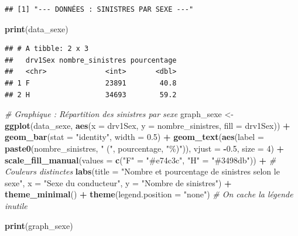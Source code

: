 \documentclass[
]{article}
\newenvironment{Shaded}{\begin{snugshade}}{\end{snugshade}}
\newcommand{\AttributeTok}[1]{\textcolor[rgb]{0.13,0.29,0.53}{#1}}
\newcommand{\CommentTok}[1]{\textcolor[rgb]{0.56,0.35,0.01}{\textit{#1}}}
\newcommand{\DecValTok}[1]{\textcolor[rgb]{0.00,0.00,0.81}{#1}}
\newcommand{\FloatTok}[1]{\textcolor[rgb]{0.00,0.00,0.81}{#1}}
\newcommand{\FunctionTok}[1]{\textcolor[rgb]{0.13,0.29,0.53}{\textbf{#1}}}
\newcommand{\NormalTok}[1]{#1}
\newcommand{\OtherTok}[1]{\textcolor[rgb]{0.56,0.35,0.01}{#1}}
\newcommand{\SpecialCharTok}[1]{\textcolor[rgb]{0.81,0.36,0.00}{\textbf{#1}}}
\newcommand{\StringTok}[1]{\textcolor[rgb]{0.31,0.60,0.02}{#1}}
\begin{document}
\begin{verbatim}
## [1] "--- DONNÉES : SINISTRES PAR SEXE ---"
\end{verbatim}

\begin{Shaded}
\begin{Highlighting}[]
\FunctionTok{print}\NormalTok{(data\_sexe)}
\end{Highlighting}
\end{Shaded}

\begin{verbatim}
## # A tibble: 2 x 3
##   drv1Sex nombre_sinistres pourcentage
##   <chr>              <int>       <dbl>
## 1 F                  23891        40.8
## 2 H                  34693        59.2
\end{verbatim}

\begin{Shaded}
\begin{Highlighting}[]
\CommentTok{\# Graphique : Répartition des sinistres par sexe}
\NormalTok{graph\_sexe }\OtherTok{\textless{}{-}} \FunctionTok{ggplot}\NormalTok{(data\_sexe, }\FunctionTok{aes}\NormalTok{(}\AttributeTok{x =}\NormalTok{ drv1Sex, }\AttributeTok{y =}\NormalTok{ nombre\_sinistres, }\AttributeTok{fill =}\NormalTok{ drv1Sex)) }\SpecialCharTok{+}
  \FunctionTok{geom\_bar}\NormalTok{(}\AttributeTok{stat =} \StringTok{"identity"}\NormalTok{, }\AttributeTok{width =} \FloatTok{0.5}\NormalTok{) }\SpecialCharTok{+}
  \FunctionTok{geom\_text}\NormalTok{(}\FunctionTok{aes}\NormalTok{(}\AttributeTok{label =} \FunctionTok{paste0}\NormalTok{(nombre\_sinistres, }\StringTok{" ("}\NormalTok{, pourcentage, }\StringTok{"\%)"}\NormalTok{)), }\AttributeTok{vjust =} \SpecialCharTok{{-}}\FloatTok{0.5}\NormalTok{, }\AttributeTok{size =} \DecValTok{4}\NormalTok{) }\SpecialCharTok{+}
  \FunctionTok{scale\_fill\_manual}\NormalTok{(}\AttributeTok{values =} \FunctionTok{c}\NormalTok{(}\StringTok{"F"} \OtherTok{=} \StringTok{"\#e74c3c"}\NormalTok{, }\StringTok{"H"} \OtherTok{=} \StringTok{"\#3498db"}\NormalTok{)) }\SpecialCharTok{+} \CommentTok{\# Couleurs distinctes}
  \FunctionTok{labs}\NormalTok{(}\AttributeTok{title =} \StringTok{"Nombre et pourcentage de sinistres selon le sexe"}\NormalTok{, }
       \AttributeTok{x =} \StringTok{"Sexe du conducteur"}\NormalTok{, }
       \AttributeTok{y =} \StringTok{"Nombre de sinistres"}\NormalTok{) }\SpecialCharTok{+}
  \FunctionTok{theme\_minimal}\NormalTok{() }\SpecialCharTok{+}
  \FunctionTok{theme}\NormalTok{(}\AttributeTok{legend.position =} \StringTok{"none"}\NormalTok{) }\CommentTok{\# On cache la légende inutile}

\FunctionTok{print}\NormalTok{(graph\_sexe)}
\end{Highlighting}
\end{Shaded}
\end{document}
